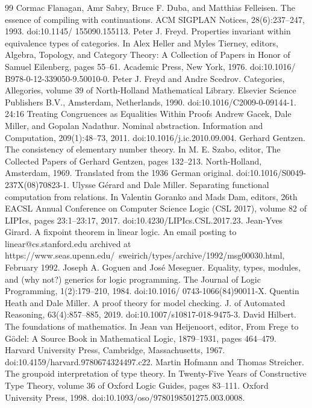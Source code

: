 \documentclass[10pt,a4paper]{article}
\begin{document}
\begin{thebibliography}{99}
 Cormac Flanagan, Amr Sabry, Bruce F. Duba, and Matthias Felleisen. The essence of compiling with continuations. ACM SIGPLAN Notices, 28(6):237–247, 1993. doi:10.1145/ 155090.155113.
 Peter J. Freyd. Properties invariant within equivalence types of categories. In Alex Heller and Myles Tierney, editors, Algebra, Topology, and Category Theory: A Collection of Papers in Honor of Samuel Eilenberg, pages 55–61. Academic Press, New York, 1976. doi:10.1016/ B978-0-12-339050-9.50010-0.
 Peter J. Freyd and Andre Scedrov. Categories, Allegories, volume 39 of North-Holland Mathematical Library. Elsevier Science Publishers B.V., Amsterdam, Netherlands, 1990. doi:10.1016/C2009-0-09144-1. 24:16   Treating Congruences as Equalities Within Proofs
 Andrew Gacek, Dale Miller, and Gopalan Nadathur. Nominal abstraction. Information and Computation, 209(1):48–73, 2011. doi:10.1016/j.ic.2010.09.004.
 Gerhard Gentzen. The consistency of elementary number theory. In M. E. Szabo, editor, The Collected Papers of Gerhard Gentzen, pages 132–213. North-Holland, Amsterdam, 1969. Translated from the 1936 German original. doi:10.1016/S0049-237X(08)70823-1.
 Ulysse Gérard and Dale Miller. Separating functional computation from relations. In Valentin Goranko and Mads Dam, editors, 26th EACSL Annual Conference on Computer Science Logic (CSL 2017), volume 82 of LIPIcs, pages 23:1–23:17, 2017. doi:10.4230/LIPIcs.CSL.2017.23.
 Jean-Yves Girard. A fixpoint theorem in linear logic. An email posting to linear@cs.stanford.edu archived at https://www.seas.upenn.edu/~sweirich/types/archive/1992/msg00030.html, February 1992.
 Joseph A. Goguen and José Meseguer. Equality, types, modules, and (why not?) generics for logic programming. The Journal of Logic Programming, 1(2):179–210, 1984. doi:10.1016/ 0743-1066(84)90011-X.
 Quentin Heath and Dale Miller. A proof theory for model checking. J. of Automated Reasoning, 63(4):857–885, 2019. doi:10.1007/s10817-018-9475-3.
 David Hilbert. The foundations of mathematics. In Jean van Heijenoort, editor, From Frege to Gödel: A Source Book in Mathematical Logic, 1879–1931, pages 464–479. Harvard University Press, Cambridge, Massachusetts, 1967. doi:10.4159/harvard.9780674324497.c22.
 Martin Hofmann and Thomas Streicher. The groupoid interpretation of type theory. In Twenty-Five Years of Constructive Type Theory, volume 36 of Oxford Logic Guides, pages 83–111. Oxford University Press, 1998. doi:10.1093/oso/9780198501275.003.0008.

\end{thebibliography}
\end{document}
